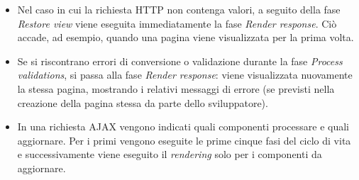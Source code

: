 \begin{itemize}
\item Nel caso in cui la richiesta HTTP non contenga valori, a seguito della fase \textit{Restore view} viene eseguita immediatamente la fase \textit{Render response}. Ciò accade, ad esempio, quando una pagina viene visualizzata per la prima volta.
\item Se si riscontrano errori di conversione o validazione durante la fase \textit{Process validations}, si passa alla fase \textit{Render response}: viene visualizzata nuovamente la stessa pagina, mostrando i relativi messaggi di errore (se previsti nella creazione della pagina stessa da parte dello sviluppatore).
\item In una richiesta AJAX vengono indicati quali componenti processare e quali aggiornare. Per i primi vengono eseguite le prime cinque fasi del ciclo di vita e successivamente viene eseguito il \textit{rendering} solo per i componenti da aggiornare.
\end{itemize}
















